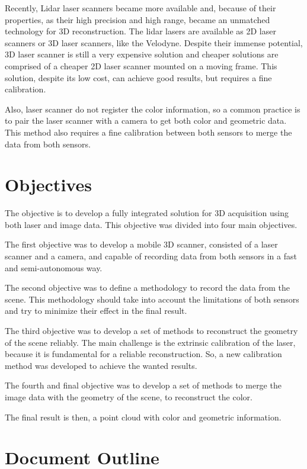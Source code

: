Recently, Lidar laser scanners became more available and, because of their properties, as their high precision and high range, became an unmatched technology for 3D reconstruction. The lidar lasers are available as 2D laser scanners or 3D laser scanners, like the Velodyne. Despite their immense potential, 3D laser scanner is still a very expensive solution and cheaper solutions are comprised of a cheaper 2D laser scanner mounted on a moving frame. This solution, despite its low cost, can achieve good results, but requires a fine calibration. 

Also, laser scanner do not register the color information, so a common practice is to pair the laser scanner with a camera to get both color and geometric data. This method also requires a fine calibration between both sensors to merge the data from both sensors. 

\section{Objectives}

The objective is to develop a fully integrated solution for 3D acquisition using both laser and image data. This objective was divided into four main objectives.

The first objective was to develop a mobile 3D scanner, consisted of a laser scanner and a camera, and capable of recording data from both sensors in a fast and semi-autonomous way.

The second objective was to define a methodology to record the data from the scene. This methodology should take into account the limitations of both sensors and try to minimize their effect in the final result.

The third objective was to develop a set of methods to reconstruct the geometry of the scene reliably. The main challenge is the extrinsic calibration of the laser, because it is fundamental for a reliable reconstruction. So, a new calibration method was developed to achieve the wanted results.

The fourth and final objective was to develop a set of methods to merge the image data with the geometry of the scene, to reconstruct the color.

The final result is then, a point cloud with color and geometric information.

\section{Document Outline}

